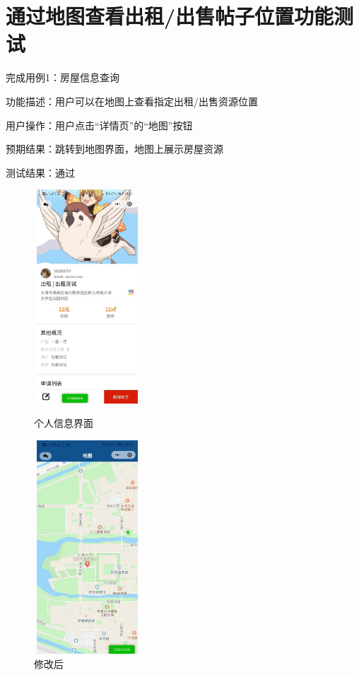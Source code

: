          \section{通过地图查看出租/出售帖子位置功能测试}
         完成用例1：房屋信息查询
      
         功能描述：用户可以在地图上查看指定出租/出售资源位置
         
         用户操作：用户点击“详情页”的“地图”按钮
         
         预期结果：跳转到地图界面，地图上展示房屋资源
         
         测试结果：通过
         
         \begin{figure}[htbp]
             \centering
             \begin{minipage}[t]{0.48\textwidth}
             \centering
             \includegraphics[width=4cm,height=8cm]{test/image/test58.png} 
            \caption{个人信息界面} 
             \end{minipage}
             \begin{minipage}[t]{0.48\textwidth}
              \centering
              \includegraphics[width=4cm,height=8cm]{test/image/test59.png} 
             \caption{修改后} 
              \end{minipage}
             \end{figure}
            \newpage                